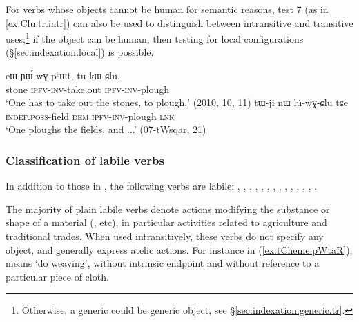 For verbs whose objects cannot be human for semantic reasons, test 7 (as in \ref{ex:Clu.tr.intr})  can also be used to distinguish between intransitive and transitive uses;\footnote{Otherwise, a generic  could be generic object, see §\ref{sec:indexation.generic.tr}.} if the object can be human, then testing for local configurations (§\ref{sec:indexation.local}) is possible.

\begin{exe}
\ex \label{ex:Clu.tr.intr}
\begin{xlist}
\ex  \label{ex:tukWClu}
\gll cɯ ɲɯ́-wɣ-pʰɯt, tu-kɯ-ɕlu, \\
stone \textsc{ipfv}-\textsc{inv}-take.out \textsc{ipfv}-\textsc{inv}-plough \\
\glt  `One has to take out the stones, to plough,' (2010, 10, 11)
\ex  \label{ex:luwGClu}
\gll tɯ-ji nɯ lú-wɣ-ɕlu tɕe \\
\textsc{indef}.\textsc{poss}-field \textsc{dem} \textsc{ipfv}-\textsc{inv}-plough \textsc{lnk} \\
\glt  `One ploughs the fields, and ...' (07-tWsqar, 21)
\end{xlist}
\end{exe}

\subsubsection{Classification of labile verbs} \label{sec:lability.categories}
In addition to those in , the following verbs are labile: , , , , , , , , ,  , , , , . 

 
The majority of plain labile verbs denote actions modifying the substance or shape of a material (,  etc), in particular activities related to agriculture and traditional trades. When used intransitively, these verbs do not specify any object, and generally express atelic actions. For instance in (\ref{ex:tCheme.pWtaR}),  means `do weaving', without intrinsic endpoint and without reference to a particular piece of cloth.

